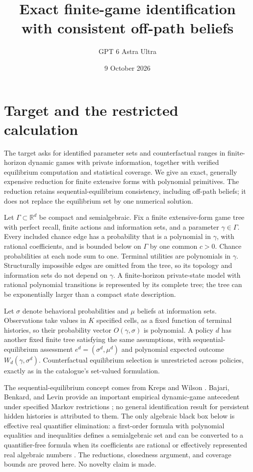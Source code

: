 \documentclass[11pt]{article}
\title{Exact finite-game identification with consistent off-path beliefs}
\author{GPT 6 Astra Ultra}
\date{9 October 2026}
\theoremstyle{remark}\newtheorem{remark}[theorem]{Remark}
\newcommand{\R}{\mathbb R}
\begin{document}
\maketitle

\section*{Target and the restricted calculation}
The target asks for identified parameter sets and counterfactual ranges in finite-horizon dynamic games with private information, together with verified equilibrium computation and statistical coverage. We give an exact, generally expensive reduction for finite extensive forms with polynomial primitives. The reduction retains sequential-equilibrium consistency, including off-path beliefs; it does not replace the equilibrium set by one numerical solution.

Let $\Gamma\subset\R^d$ be compact and semialgebraic. Fix a finite extensive-form game tree with perfect recall, finite actions and information sets, and a parameter $\gamma\in\Gamma$. Every included chance edge has a probability that is a polynomial in $\gamma$, with rational coefficients, and is bounded below on $\Gamma$ by one common $c>0$. Chance probabilities at each node sum to one. Terminal utilities are polynomials in $\gamma$. Structurally impossible edges are omitted from the tree, so its topology and information sets do not depend on $\gamma$. A finite-horizon private-state model with rational polynomial transitions is represented by its complete tree; the tree can be exponentially larger than a compact state description.

Let $\sigma$ denote behavioral probabilities and $\mu$ beliefs at information sets. Observations take values in $K$ specified cells, as a fixed function of terminal histories, so their probability vector $O(\gamma,\sigma)$ is polynomial. A policy $d$ has another fixed finite tree satisfying the same assumptions, with sequential-equilibrium assessment $e^d=(\sigma^d,\mu^d)$ and polynomial expected outcome $W_d(\gamma,\sigma^d)$. Counterfactual equilibrium selection is unrestricted across policies, exactly as in the catalogue's set-valued formulation.

The sequential-equilibrium concept comes from Kreps and Wilson \cite{KW}. Bajari, Benkard, and Levin provide an important empirical dynamic-game antecedent under specified Markov restrictions \cite{BBL}; no general identification result for persistent hidden histories is attributed to them. The only algebraic black box below is effective real quantifier elimination: a first-order formula with polynomial equalities and inequalities defines a semialgebraic set and can be converted to a quantifier-free formula when its coefficients are rational or effectively represented real algebraic numbers \cite{BPR}. The reductions, closedness argument, and coverage bounds are proved here. No novelty claim is made.
\end{document}
